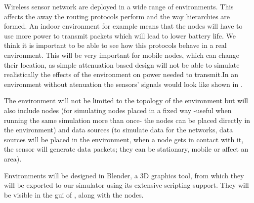 
Wireless sensor network are deployed in a wide range of environments. This affects
the away the routing protocols perform and the way hierarchies are formed. An indoor
environment for example means that the nodes will have to use more power to transmit
packets which will lead to lower battery life. We think it is important to be able to
see how this protocols behave in a real environment. This will be very important for
mobile nodes, which can change their location, as simple attenuation based design will
not be able to simulate realistically the effects of the environment on power needed to
transmit.In an environment without atenuation 
the sensors' signals would look like shown in . 

The environment will not be limited to the topology of the environment but will also 
include nodes (for simulating nodes placed in a fixed way -useful when running the same
simulation more than once- the nodes can be placed directly in the environment) and data sources
(to simulate data for the networks, data sources will be placed in
the environment, when a node gets in contact with it, the sensor will generate data packets; 
they can be stationary, mobile or affect an area).


Environments will be designed in Blender, a 3D graphics tool, from which they will be
exported to our simulator using its extensive scripting support. They will be visible
in the gui of \codename, along with the nodes.


